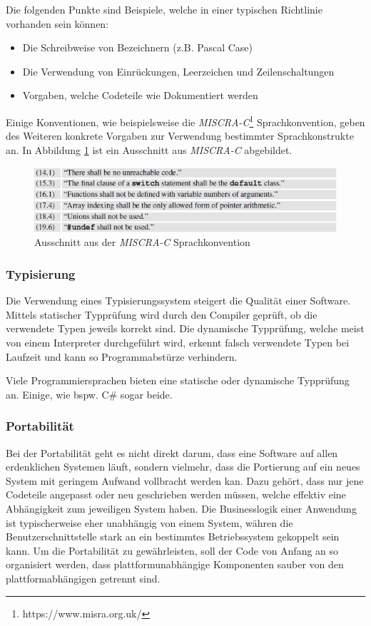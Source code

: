 Die folgenden Punkte sind Beispiele, welche in einer typischen Richtlinie vorhanden sein können:
\begin{itemize}
   \item Die Schreibweise von Bezeichnern (z.B. Pascal Case)
   \item Die Verwendung von Einrückungen, Leerzeichen und Zeilenschaltungen
   \item Vorgaben, welche Codeteile wie Dokumentiert werden
\end{itemize}
Einige Konventionen, wie beispielsweise die \textit{MISCRA-C}\footnote{https://www.misra.org.uk/} Sprachkonvention, geben des Weiteren konkrete Vorgaben zur Verwendung bestimmter Sprachkonstrukte an.
In Abbildung \ref{fig:misra} ist ein Ausschnitt aus \textit{MISCRA-C} abgebildet.
\begin{figure}[H]
   \centering
   \includegraphics[width=1.0\textwidth]{gfx/misra.png}
   \caption{
      Ausschnitt aus der \textit{MISCRA-C} Sprachkonvention
   }
   \label{fig:misra}
\end{figure}


\subsubsection{Typisierung}
Die Verwendung eines Typisierungssystem steigert die Qualität einer Software.
Mittels statischer Typprüfung wird durch den Compiler geprüft, ob die verwendete Typen jeweils korrekt sind.
Die dynamische Typprüfung, welche meist von einem Interpreter durchgeführt wird, erkennt falsch verwendete Typen bei Laufzeit und kann so Programmabstürze verhindern.

Viele Programmiersprachen bieten eine statische oder dynamische Typprüfung an.
Einige, wie bspw. C\# sogar beide.

\subsubsection{Portabilität}
Bei der Portabilität geht es nicht direkt darum, dass eine Software auf allen erdenklichen Systemen läuft, sondern vielmehr, dass die Portierung auf ein neues System mit geringem Aufwand vollbracht werden kan.
Dazu gehört, dass nur jene Codeteile angepasst oder neu geschrieben werden müssen, welche effektiv eine Abhängigkeit zum jeweiligen System haben.
Die Businesslogik einer Anwendung ist typischerweise eher unabhängig von einem System, währen die Benutzerschnittstelle stark an ein bestimmtes Betriebssystem gekoppelt sein kann.
Um die Portabilität zu gewährleisten, soll der Code von Anfang an so organisiert werden, dass plattformunabhängige Komponenten sauber von den plattformabhängigen getrennt sind.

